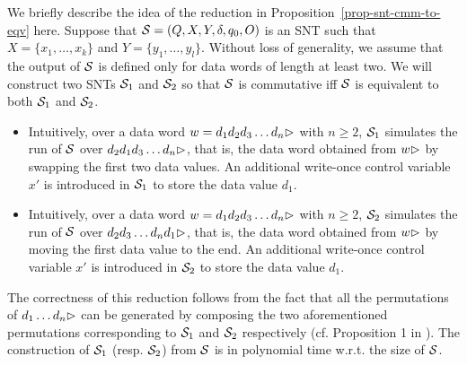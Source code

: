 We briefly describe the idea of the reduction in Proposition~\ref{prop-snt-cmm-to-eqv} here. Suppose that ${\mathcal{S} }=(Q, X, Y, \delta, q_0, O)$ is an SNT such that $X=\{x_1,\dots,x_k\}$ and $Y=\{y_1,\dots,y_l\}$. Without loss of generality, we assume that the output of ${\mathcal{S} }$ is defined only for data words of length at least two. We will construct two SNTs ${\mathcal{S} }_1$ and ${\mathcal{S} }_2$ so that ${\mathcal{S} }$ is commutative iff ${\mathcal{S} }$ is equivalent to both ${\mathcal{S} }_1$ and ${\mathcal{S} }_2$.
\begin{itemize}
\item Intuitively, over a data word $w=d_1 d_2 d_3 \dots d_n\rhd$ with $n\ge 2$, ${\mathcal{S} }_1$ simulates the run of ${\mathcal{S} }$ over $d_2 d_1 d_3 \dots d_n\rhd$, that is, the data word obtained from $w\rhd$ by swapping the first two data values. An additional write-once control variable $x'$ is introduced in ${\mathcal{S} }_1$ to store the data value $d_1$.
%
\item Intuitively, over a data word $w=d_1 d_2 d_3 \dots d_n\rhd$ with $n\ge 2$, ${\mathcal{S} }_2$ simulates the run of ${\mathcal{S} }$ over $d_2 d_3 \dots d_n d_1\rhd$, that is, the data word obtained from $w\rhd$ by moving the first data value to the end. An additional write-once control variable $x'$ is introduced in ${\mathcal{S} }_2$ to store the data value $d_1$.
\end{itemize}
The correctness of this reduction follows from the fact that all the permutations of $d_1\dots d_n\rhd$ can be generated by composing the two aforementioned permutations corresponding to ${\mathcal{S} }_1$ and ${\mathcal{S} }_2$ respectively (cf. Proposition 1 in \cite{CHSW15}). The construction of ${\mathcal{S} }_1$ (resp. ${\mathcal{S} }_2$) from ${\mathcal{S} }$ is in  polynomial time w.r.t. the size of ${\mathcal{S} }$.

